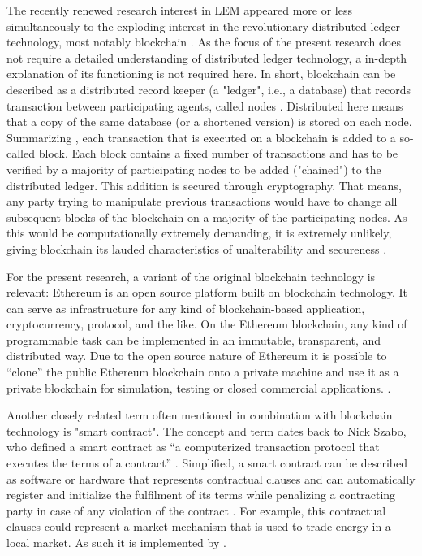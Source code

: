 The recently renewed research interest in LEM appeared more or less simultaneously to the exploding interest in the revolutionary distributed ledger technology, most notably blockchain \citep{Swan:2015}. As the focus of the present research does not require a detailed understanding of distributed ledger technology, a in-depth explanation of its functioning is not required here. In short, blockchain can be described as a distributed record keeper (a "ledger", i.e., a database) that records transaction between participating agents, called nodes \citep{Burger:2016}. Distributed here means that a copy of the same database (or a shortened version) is stored on each node. Summarizing \citet{Tapscott:2016}, each transaction that is executed on a blockchain is added to a so-called block. Each block contains a fixed number of transactions and has to be verified by a majority of participating nodes to be added ("chained") to the distributed ledger. This addition is secured through cryptography. That means, any party trying to manipulate previous transactions would have to change all subsequent blocks of the blockchain on a majority of the participating nodes. As this would be computationally extremely demanding, it is extremely unlikely, giving blockchain its lauded characteristics of unalterability and secureness \citep{Burger:2016}.

For the present research, a variant of the original blockchain technology is relevant: Ethereum is an open source platform built on blockchain technology. It can serve as infrastructure for any kind of blockchain-based application, cryptocurrency, protocol, and the like. On the Ethereum blockchain, any kind of programmable task can be implemented in an immutable, transparent, and distributed way. Due to the open source nature of Ethereum it is possible to “clone” the public Ethereum blockchain onto a private machine and use it as a private blockchain for simulation, testing or closed commercial applications. \citep{Ethereum:2018doc, Swan:2015}.

Another closely related term often mentioned in combination with blockchain technology is "smart contract". The concept and term dates back to Nick Szabo, who defined a smart contract as “a computerized transaction protocol that executes the terms of a contract” \citep{szabo:1994}. Simplified, a smart contract can be described as software or hardware that represents contractual clauses and can automatically register and initialize the fulfilment of its terms while penalizing a contracting party in case of any violation of the contract \citep{Szabo:1997}. For example, this contractual clauses could represent a market mechanism that is used to trade energy in a local market. As such it is implemented by \citet{Mengelkamp:2018a}.


